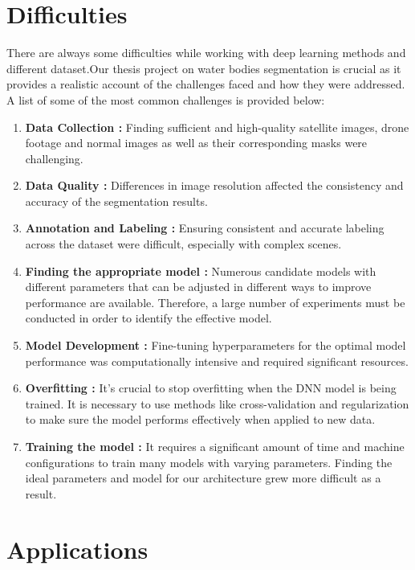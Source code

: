 \section{Difficulties}
There are always some difficulties while working with deep learning methods and different dataset.Our thesis project on water bodies segmentation is crucial as it provides a realistic account of the challenges faced and how they were addressed.
A list of some of the most common challenges is provided below:
\begin{enumerate}
       \item \textbf{Data Collection :} Finding sufficient and high-quality satellite images, drone footage and normal images as well as their corresponding masks were challenging.
        \item \textbf{Data Quality :} Differences in image resolution affected the consistency and accuracy of the segmentation results.
        \item \textbf{Annotation and Labeling :} Ensuring consistent and accurate labeling across the dataset were difficult, especially with complex scenes.
        \item \textbf{Finding the appropriate model :} Numerous candidate models with different parameters that can be adjusted in different ways to improve performance are available. Therefore, a large number of experiments must be conducted in order to identify the effective model.
        \item \textbf{Model Development :} Fine-tuning hyperparameters for the optimal model performance was computationally intensive and required significant resources.
        \item \textbf{Overfitting :} It's crucial to stop overfitting when the DNN model is being trained. It is necessary to use methods like cross-validation and regularization to make sure the model performs effectively when applied to new data.
        \item \textbf{Training the model :} It requires a significant amount of time and machine configurations to train many models with varying parameters. Finding the ideal parameters and model for our architecture grew more difficult as a result.

\end{enumerate}


\section{Applications}


